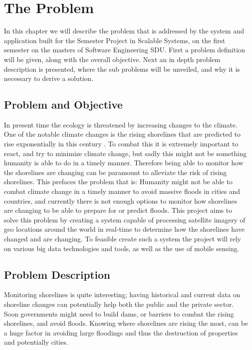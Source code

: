\chapter{The Problem} \label{ch:the-problem}

In this chapter we will describe the problem that is addressed by the system and application built for the Semester Project in Scalable Systems, on the first semester on the masters of Software Engineering SDU. \medbreak
\noindent
First a problem definition will be given, along with the overall objective. Next an in depth problem description is presented, where the sub problems will be unveiled, and why it is necessary to derive a solution.

\section{Problem and Objective}

In present time the ecology is threatened by increasing changes to the climate. One of the notable climate changes is the rising shorelines that are predicted to rise exponentially in this century . To combat this it is extremely important to react, and try to minimize climate change, but sadly this might not be something humanity is able to do in a timely manner. Therefore being able to monitor how the shorelines are changing can be paramount to alleviate the risk of rising shorelines. This prefaces the problem that is: \medbreak 
\noindent
Humanity might not be able to combat climate change in a timely manner to avoid massive floods in cities and countries, and currently there is not enough options to monitor how shorelines are changing to be able to prepare for or predict floods. \medbreak 
\noindent
This project aims to solve this problem by creating a system capable of processing satellite imagery of geo locations around the world in real-time to determine how the shorelines have changed and are changing. \medbreak 
\noindent
To feasible create such a system the project will rely on various big data technologies and tools, as well as the use of mobile sensing.

\section{Problem Description} \label{sec:problem-description}

Monitoring shorelines is quite interesting; having historical and current data on shoreline changes can potentially help both the public and the private sector.  \medbreak 
\noindent
Soon governments might need to build dams, or barriers to combat the rising shorelines, and avoid floods. Knowing where shorelines are rising the most, can be a huge factor in avoiding large floodings and thus the destruction of properties and potentially cities.

